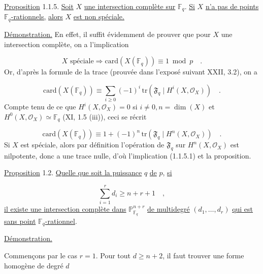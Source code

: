 \underline{Proposition} 1.1.5. \underline{Soit} $X$ \underline{une intersection complète sur} $\mathbb{F}_q$. \underline{Si} $X$ \underline{n'a pas de points} $\mathbb{F}_q$\underline{-rationnels,} \underline{alors} $X$ \underline{est non spéciale.}



\underline{Démonstration.} En effet, il suffit évidemment de prouver que pour $X$ une intersection complète, on a l'implication

\begin{equation}\tag{1.1.5.1}
X \text{ spéciale} \Longrightarrow \mathrm{card}(X(\mathbb{F}_q)) \equiv 1 \bmod p \quad .
\end{equation}
Or, d'après la formule de la trace (prouvée dans l'exposé suivant XXII, 3.2), on a

\begin{equation*}
\mathrm{card}(X(\mathbb{F}_q)) \equiv \sum_{i \geq 0} (-1)^i \, \mathrm{tr}(\mathfrak{F}_q \mid H^i(X,\mathcal{O}_X)) \quad .
\end{equation*}
Compte tenu de ce que $H^i(X,\mathcal{O}_X)=0$ si $i \neq 0, n=\dim(X)$ et $H^0(X,\mathcal{O}_X) \simeq \mathbb{F}_q$ (XI, 1.5 (iii)), ceci se récrit

\begin{equation*}
\mathrm{card}(X(\mathbb{F}_q)) \equiv 1 + (-1)^n \, \mathrm{tr}(\mathfrak{F}_q \mid H^n(X,\mathcal{O}_X)) \quad .
\end{equation*}
Si $X$ est spéciale, alors par définition l'opération de $\mathfrak{F}_q$ sur $H^n(X,\mathcal{O}_X)$ est nilpotente, donc a une trace nulle, d'où l'implication (1.1.5.1) et la proposition.

\underline{Proposition} 1.2. \underline{Quelle que soit la puissance} $q$ \underline{de} $p$, \underline{si}

\begin{equation*}
\sum_{i=1}^r d_i \geq n+r+1 \quad ,
\end{equation*}
\underline{il existe une intersection complète dans} $\mathbb{P}^{n+r}_{\mathbb{F}_q}$ \underline{de multidegré} $(d_1,\dots,d_r)$ \underline{qui est sans point} $\mathbb{F}_q$\underline{-rationnel}.

\underline{Démonstration.}

Commençons par le cas $r=1$. Pour tout $d \geq n+2$, il faut trouver une forme homogène de degré $d$ 




